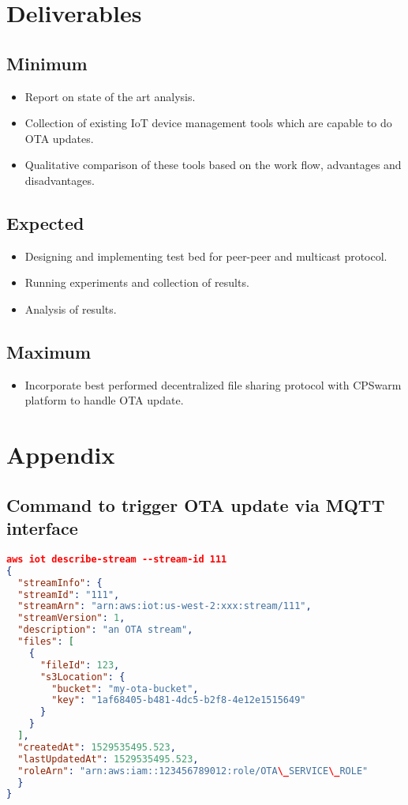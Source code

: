 \documentclass[12pt]{article}
\begin{document}
\newpage
\section{Deliverables}
\subsection{Minimum}
\begin{itemize}
\item Report on state of the art analysis.
\item Collection of existing IoT device management tools which are capable to do OTA updates.
\item Qualitative comparison of these tools based on the work flow, advantages and disadvantages.
\end{itemize}
\subsection{Expected}
\begin{itemize}
\item Designing and implementing test bed for peer-peer and multicast protocol.
\item Running experiments and collection of results.
\item Analysis of results.
\end{itemize}
\subsection{Maximum}
\begin{itemize}
\item Incorporate best performed decentralized file sharing protocol with CPSwarm platform to handle OTA update.
\end{itemize}




\newpage
\appendix
\section{Appendix}
\subsection{Command to trigger OTA update via MQTT interface \cite{misc03}}
\label{appendix:aws_freeRtosCmd}
\begin{lstlisting}[language=json,firstnumber=1]
aws iot describe-stream --stream-id 111
{
  "streamInfo": {
  "streamId": "111",
  "streamArn": "arn:aws:iot:us-west-2:xxx:stream/111",
  "streamVersion": 1,
  "description": "an OTA stream",
  "files": [
    {
      "fileId": 123,
      "s3Location": {
        "bucket": "my-ota-bucket",
        "key": "1af68405-b481-4dc5-b2f8-4e12e1515649"
      }
    }
  ],
  "createdAt": 1529535495.523,
  "lastUpdatedAt": 1529535495.523,
  "roleArn": "arn:aws:iam::123456789012:role/OTA\_SERVICE\_ROLE"
  }
} 

\end{lstlisting}
\end{document}
